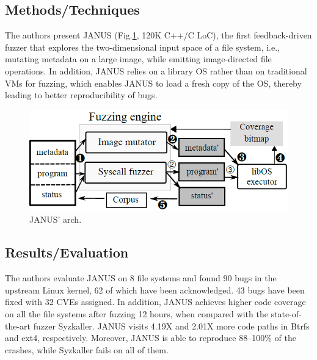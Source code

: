 \subsection{Methods/Techniques}
The authors present JANUS (Fig.\ref{fig:janus}, 120K C++/C LoC), the first feedback-driven fuzzer
that explores the two-dimensional input space of a file system,
i.e., mutating metadata on a large image, while emitting image-directed
file operations. In addition, JANUS relies on a library
OS rather than on traditional VMs for fuzzing, which enables
JANUS to load a fresh copy of the OS, thereby leading to better
reproducibility of bugs.
\begin{figure}[h]
    \centering
    \includegraphics[scale=0.5]{janus.png} %
    \caption{JANUS' arch.}	
    \label{fig:janus}
\end{figure}
\subsection{Results/Evaluation}
The authors evaluate JANUS on 8 file systems
and found 90 bugs in the upstream Linux kernel, 62 of which have
been acknowledged. 43 bugs have been fixed with 32
CVEs assigned. In addition, JANUS achieves higher code coverage
on all the file systems after fuzzing 12 hours, when compared
with the state-of-the-art fuzzer Syzkaller.
JANUS visits 4.19X and 2.01X more code paths in Btrfs and ext4,
respectively. Moreover, JANUS is able to reproduce 88–100\% of
the crashes, while Syzkaller fails on all of them.
